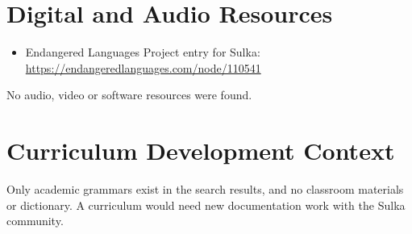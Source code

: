 \documentclass[12pt]{article}
\begin{document}
\section{Digital and Audio Resources}
\begin{itemize}
\item Endangered Languages Project entry for Sulka: \url{https://endangeredlanguages.com/node/110541}
\end{itemize}
No audio, video or software resources were found.

\section{Curriculum Development Context}
Only academic grammars exist in the search results, and no classroom materials or dictionary. A curriculum would need new documentation work with the Sulka community.
\end{document}
